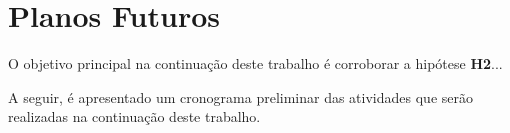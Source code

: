 \section{Planos Futuros} \label{section:planosfuturos}

O objetivo principal na continuação deste trabalho é corroborar a hipótese \textbf{H2}...


A seguir, é apresentado um cronograma preliminar das atividades que serão realizadas na continuação deste trabalho.

\begin{table}[h]
\caption{Cronograma inicial para o TCC 2}
\label{tab:cronograma}
\end{table}
